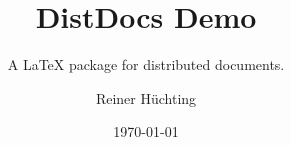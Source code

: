 \documentclass{scrartcl}
\begin{document}
  \title{DistDocs Demo}
  \subtitle{A \LaTeX{} package for distributed documents.}
  \author{Reiner Hüchting}
  \date{\today}

  \maketitle

\end{document}

